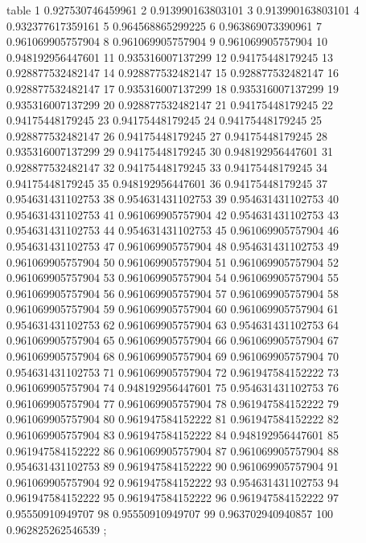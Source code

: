 table {%
	1 0.927530746459961
	2 0.913990163803101
	3 0.913990163803101
	4 0.932377617359161
	5 0.964568865299225
	6 0.963869073390961
	7 0.961069905757904
	8 0.961069905757904
	9 0.961069905757904
	10 0.948192956447601
	11 0.935316007137299
	12 0.94175448179245
	13 0.928877532482147
	14 0.928877532482147
	15 0.928877532482147
	16 0.928877532482147
	17 0.935316007137299
	18 0.935316007137299
	19 0.935316007137299
	20 0.928877532482147
	21 0.94175448179245
	22 0.94175448179245
	23 0.94175448179245
	24 0.94175448179245
	25 0.928877532482147
	26 0.94175448179245
	27 0.94175448179245
	28 0.935316007137299
	29 0.94175448179245
	30 0.948192956447601
	31 0.928877532482147
	32 0.94175448179245
	33 0.94175448179245
	34 0.94175448179245
	35 0.948192956447601
	36 0.94175448179245
	37 0.954631431102753
	38 0.954631431102753
	39 0.954631431102753
	40 0.954631431102753
	41 0.961069905757904
	42 0.954631431102753
	43 0.954631431102753
	44 0.954631431102753
	45 0.961069905757904
	46 0.954631431102753
	47 0.961069905757904
	48 0.954631431102753
	49 0.961069905757904
	50 0.961069905757904
	51 0.961069905757904
	52 0.961069905757904
	53 0.961069905757904
	54 0.961069905757904
	55 0.961069905757904
	56 0.961069905757904
	57 0.961069905757904
	58 0.961069905757904
	59 0.961069905757904
	60 0.961069905757904
	61 0.954631431102753
	62 0.961069905757904
	63 0.954631431102753
	64 0.961069905757904
	65 0.961069905757904
	66 0.961069905757904
	67 0.961069905757904
	68 0.961069905757904
	69 0.961069905757904
	70 0.954631431102753
	71 0.961069905757904
	72 0.961947584152222
	73 0.961069905757904
	74 0.948192956447601
	75 0.954631431102753
	76 0.961069905757904
	77 0.961069905757904
	78 0.961947584152222
	79 0.961069905757904
	80 0.961947584152222
	81 0.961947584152222
	82 0.961069905757904
	83 0.961947584152222
	84 0.948192956447601
	85 0.961947584152222
	86 0.961069905757904
	87 0.961069905757904
	88 0.954631431102753
	89 0.961947584152222
	90 0.961069905757904
	91 0.961069905757904
	92 0.961947584152222
	93 0.954631431102753
	94 0.961947584152222
	95 0.961947584152222
	96 0.961947584152222
	97 0.95550910949707
	98 0.95550910949707
	99 0.963702940940857
	100 0.962825262546539
};
